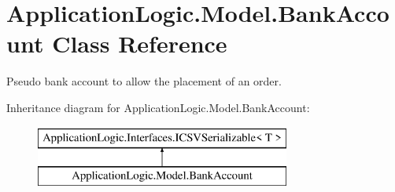 \hypertarget{class_application_logic_1_1_model_1_1_bank_account}{
\section{ApplicationLogic.Model.BankAccount Class Reference}
\label{class_application_logic_1_1_model_1_1_bank_account}
}


Pseudo bank account to allow the placement of an order.  


Inheritance diagram for ApplicationLogic.Model.BankAccount:\begin{figure}[H]
\begin{center}
\leavevmode
\includegraphics[height=2.000000cm]{class_application_logic_1_1_model_1_1_bank_account}
\end{center}
\end{figure}
